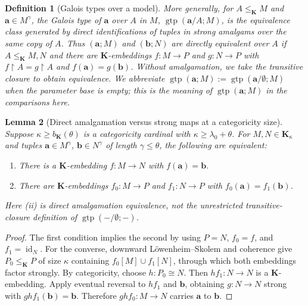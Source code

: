 \documentclass[11pt]{article}
\newcommand{\K}{\mathbf K}
\newcommand{\gtp}{\operatorname{gtp}}
\newcommand{\ba}{\mathbf{a}}
\newcommand{\bb}{\mathbf{b}}
\theoremstyle{plain}
\newtheorem{definition}{Definition}[section]
\newtheorem{lemma}[definition]{Lemma}
\begin{document}
\begin{definition}[Galois types over a model]
More generally, for $A\leq_\K M$ and $\ba\in M^\gamma$,
the \emph{Galois type of $\ba$ over $A$ in $M$},
$\gtp(\ba/A;M)$, is the equivalence class generated by
direct identifications of tuples in strong amalgams
\emph{over the same copy of $A$}. Thus
$(\ba;M)$ and $(\bb;N)$ are directly equivalent
over $A$ if $A\leq_\K M,N$ and there are
$\K$-embeddings $f:M\to P$ and $g:N\to P$ with
$f\!\restriction A=g\!\restriction A$ and
$f(\ba)=g(\bb)$. Without amalgamation, we take
the transitive closure to obtain equivalence.
We abbreviate $\gtp(\ba;M):=\gtp(\ba/\emptyset;M)$
when the parameter base is empty; this is the
meaning of $\gtp(\ba;M)$ in the comparisons here.
\end{definition}

\begin{lemma}[Direct amalgamation versus strong maps at a categoricity size]
\label{lem:direct-amalgamation-reversal}
Suppose $\kappa\geq b_\K(\theta)$ is a categoricity
cardinal with $\kappa\geq\lambda_0+\theta$.
For $M,N\in\K_\kappa$ and tuples
$\ba\in M^\gamma$, $\bb\in N^\gamma$
of length $\gamma\leq\theta$, the following are equivalent:
\begin{enumerate}[label=\textup{(\roman*)}]
\item There is a $\K$-embedding $f:M\to N$ with $f(\ba)=\bb$.
\item There are $\K$-embeddings $f_0:M\to P$ and
$f_1:N\to P$ with $f_0(\ba)=f_1(\bb)$.
\end{enumerate}
Here (ii) is \emph{direct amalgamation equivalence},
not the unrestricted transitive-closure definition of
$\gtp(-/\emptyset;-)$.
\end{lemma}
\begin{proof}
The first condition implies the second by using
$P=N$, $f_0=f$, and $f_1=\operatorname{id}_N$.
For the converse, downward L\"owenheim--Skolem
and coherence give $P_0\leq_\K P$ of size $\kappa$
containing $f_0[M]\cup f_1[N]$, through which
both embeddings factor strongly. By categoricity,
choose $h:P_0\cong N$. Then $h f_1:N\to N$
is a $\K$-embedding. Apply eventual reversal to
$h f_1$ and $\bb$, obtaining $g:N\to N$ strong
with $g h f_1(\bb)=\bb$. Therefore
$g h f_0:M\to N$ carries $\ba$ to $\bb$.
\end{proof}
\end{document}
